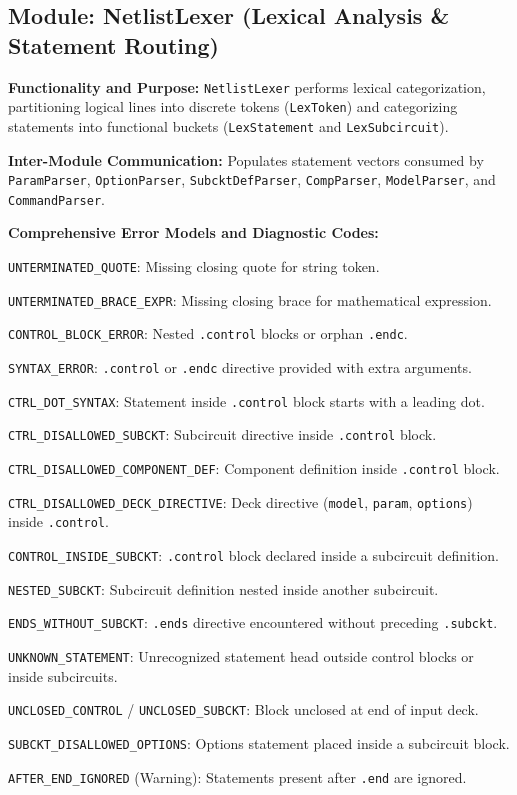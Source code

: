 \subsection{Module: NetlistLexer (Lexical Analysis \& Statement Routing)}

\textbf{Functionality and Purpose:} \texttt{NetlistLexer} performs lexical categorization, partitioning logical lines into discrete tokens (\texttt{LexToken}) and categorizing statements into functional buckets (\texttt{LexStatement} and \texttt{LexSubcircuit}).

\textbf{Inter-Module Communication:} Populates statement vectors consumed by \texttt{ParamParser}, \texttt{OptionParser}, \texttt{SubcktDefParser}, \texttt{CompParser}, \texttt{ModelParser}, and \texttt{CommandParser}.

\textbf{Comprehensive Error Models and Diagnostic Codes:}
\begin{compactitem}
    \item \texttt{UNTERMINATED\_QUOTE}: Missing closing quote for string token.
    \item \texttt{UNTERMINATED\_BRACE\_EXPR}: Missing closing brace for mathematical expression.
    \item \texttt{CONTROL\_BLOCK\_ERROR}: Nested \texttt{.control} blocks or orphan \texttt{.endc}.
    \item \texttt{SYNTAX\_ERROR}: \texttt{.control} or \texttt{.endc} directive provided with extra arguments.
    \item \texttt{CTRL\_DOT\_SYNTAX}: Statement inside \texttt{.control} block starts with a leading dot.
    \item \texttt{CTRL\_DISALLOWED\_SUBCKT}: Subcircuit directive inside \texttt{.control} block.
    \item \texttt{CTRL\_DISALLOWED\_COMPONENT\_DEF}: Component definition inside \texttt{.control} block.
    \item \texttt{CTRL\_DISALLOWED\_DECK\_DIRECTIVE}: Deck directive (\texttt{model}, \texttt{param}, \texttt{options}) inside \texttt{.control}.
    \item \texttt{CONTROL\_INSIDE\_SUBCKT}: \texttt{.control} block declared inside a subcircuit definition.
    \item \texttt{NESTED\_SUBCKT}: Subcircuit definition nested inside another subcircuit.
    \item \texttt{ENDS\_WITHOUT\_SUBCKT}: \texttt{.ends} directive encountered without preceding \texttt{.subckt}.
    \item \texttt{UNKNOWN\_STATEMENT}: Unrecognized statement head outside control blocks or inside subcircuits.
    \item \texttt{UNCLOSED\_CONTROL} / \texttt{UNCLOSED\_SUBCKT}: Block unclosed at end of input deck.
    \item \texttt{SUBCKT\_DISALLOWED\_OPTIONS}: Options statement placed inside a subcircuit block.
    \item \texttt{AFTER\_END\_IGNORED} (Warning): Statements present after \texttt{.end} are ignored.
\end{compactitem}

